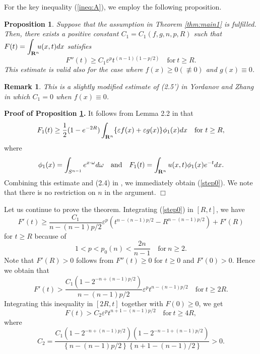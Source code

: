 \documentclass[a4paper,12pt]{article}
\numberwithin{equation}{section}
\def\R{{\bf R}}
\def\d{\displaystyle}
\def\e{{\varepsilon}}
\newtheorem{prop}{Proposition}[section]
\newtheorem{rem}{Remark}[section]
\begin{document}
\par
For the key inequality (\ref{ineq:A}), we employ the following proposition.
\begin{prop}
\label{prop:step0}
Suppose that the assumption in Theorem \ref{thm:main1} is fulfilled.
Then, there exists a positive constant $C_1=C_1(f,g,n,p,R)$
such that $F(t)=\d\int_{\R^n}\!\!\!u(x,t)dx$ satisfies
\begin{equation}
\label{step0}
F''(t)\ge C_1\e^pt^{(n-1)(1-p/2)}\quad\mbox{for}\ t\ge R.
\end{equation}
This estimate is valid also for the case where $f(x)\ge0(\not\equiv0)$ and $g(x)\equiv0$.
\end{prop}
\begin{rem}
This is a slightly modified estimate of (2.5') in Yordanov and Zhang \cite{YZ06}
in which $C_1=0$ when $f(x)\equiv0$.
\end{rem}
\par\noindent
{\bf Proof of Proposition \ref{prop:step0}.}
It follows from Lemma 2.2 in \cite{YZ06} that
\[
F_1(t)\ge\frac{1}{2}(1-e^{-2R})\int_{\R^n}\{\e f(x)+\e g(x)\}\phi_1(x)dx
\quad\mbox{for}\ t\ge R,
\]
where
\[
\phi_1(x)=\int_{S^{n-1}}e^{x\cdot\omega}d\omega
\quad\mbox{and}\quad
F_1(t)=\int_{\R^n}u(x,t)\phi_1(x)e^{-t}dx.
\]
Combining this estimate and (2.4) in \cite{YZ06}, we immediately obtain  (\ref{step0}).
We note that there is no restriction on $n$ in the argument.
\hfill$\Box$
\vskip10pt
\par
Let us continue to prove the theorem.
Integrating (\ref{step0}) in $[R,t]$, we have
\[
F'(t)\ge\frac{C_1}{n-(n-1)p/2}\e^p\left(t^{n-(n-1)p/2}-R^{n-(n-1)p/2}\right)+F'(R)
\]
for $t\ge R$ because of
\[
1<p<p_0(n)<\frac{2n}{n-1}\quad\mbox{for}\ n\ge2.
\]
Note that $F'(R)>0$ follows from $F''(t)\ge0$ for $t\ge0$ and $F'(0)>0$.
Hence we obtain that
\begin{equation}
\label{step1}
F'(t)>\frac{C_1\left(1-2^{-n+(n-1)p/2}\right)}{n-(n-1)p/2}\e^pt^{n-(n-1)p/2}
\quad\mbox{for}\ t\ge2R.
\end{equation}
Integrating this inequality in $[2R,t]$ together with $F(0)\ge0$, we get
\begin{equation}
\label{condition_F}
F(t)>C_2\e^pt^{n+1-(n-1)p/2}
\quad\mbox{for}\ t\ge4R,
\end{equation}
where
\[
C_2=\frac{C_1\left(1-2^{-n+(n-1)p/2}\right)\left(1-2^{-n-1+(n-1)p/2}\right)}
{\left\{n-(n-1)p/2\right\}\left\{n+1-(n-1)/2\right\}}>0.
\]
\par
\end{document}
